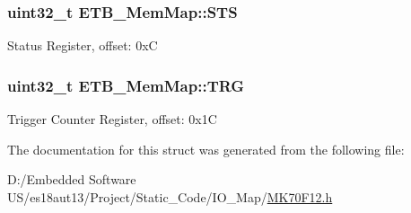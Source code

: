 \subsubsection[{S\+T\+S}]{\setlength{\rightskip}{0pt plus 5cm}uint32\+\_\+t E\+T\+B\+\_\+\+Mem\+Map\+::\+S\+T\+S}\label{struct_e_t_b___mem_map_a5a471e968aca953fb748c16b10d56939}
Status Register, offset\+: 0x\+C \hypertarget{struct_e_t_b___mem_map_a96dc184cb9f6ea6ba7b299b05c58d4ed}{}
\subsubsection[{T\+R\+G}]{\setlength{\rightskip}{0pt plus 5cm}uint32\+\_\+t E\+T\+B\+\_\+\+Mem\+Map\+::\+T\+R\+G}\label{struct_e_t_b___mem_map_a96dc184cb9f6ea6ba7b299b05c58d4ed}
Trigger Counter Register, offset\+: 0x1\+C 

The documentation for this struct was generated from the following file\+:\begin{DoxyCompactItemize}
\item 
D\+:/\+Embedded Software U\+S/es18aut13/\+Project/\+Static\+\_\+\+Code/\+I\+O\+\_\+\+Map/\hyperlink{_m_k70_f12_8h}{M\+K70\+F12.\+h}\end{DoxyCompactItemize}
